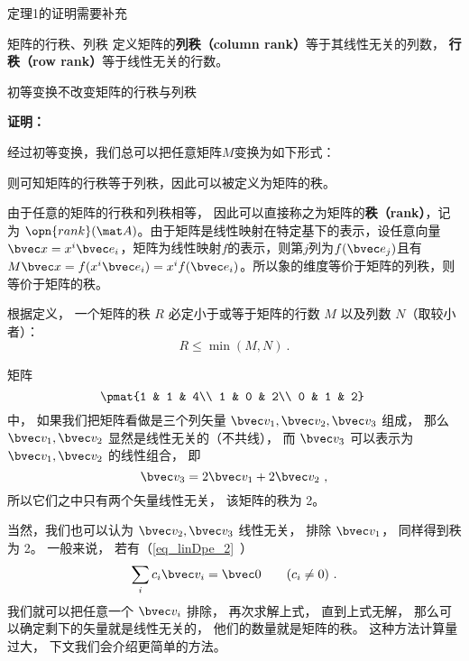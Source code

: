 
\begin{issues}
\issueDraft 定理1的证明需要补充
\end{issues}


\begin{definition}{矩阵的行秩、列秩}
定义矩阵的\textbf{列秩（column rank）}等于其线性无关的列数， \textbf{行秩（row rank）}等于线性无关的行数。
\end{definition}
\begin{theorem}{}
初等变换不改变矩阵的行秩与列秩
\end{theorem}
\textbf{证明：}

经过初等变换，我们总可以把任意矩阵$M$变换为如下形式：


则可知矩阵的行秩等于列秩，因此可以被定义为矩阵的秩。

\begin{definition}{}
由于任意的矩阵的行秩和列秩相等， 因此可以直接称之为矩阵的\textbf{秩（rank）}，记为 $\opn{rank}(\mat A)$。由于矩阵是线性映射在特定基下的表示，设任意向量$\bvec x=x^i\bvec e_i$，矩阵为线性映射$f$的表示，则第$j$列为$f(\bvec e_j)$且有$M\bvec x=f(x^i\bvec  e_i)=x^if(\bvec e_i)$。所以象的维度等价于矩阵的列秩，则等价于矩阵的秩。
\end{definition}




\begin{theorem}{}
根据定义， 一个矩阵的秩 $R$ 必定小于或等于矩阵的行数 $M$ 以及列数 $N$（取较小者）：
\begin{equation}
R\leq \min (M, N)~.
\end{equation}
\end{theorem}

\begin{example}{}
矩阵
\begin{equation}\label{eq_MatRnk_1}
\pmat{1 & 1 & 4\\ 1 & 0 & 2\\ 0 & 1 & 2}~
\end{equation}
中， 如果我们把矩阵看做是三个列矢量 $\bvec v_1, \bvec v_2, \bvec v_3$ 组成， 那么 $\bvec v_1, \bvec v_2$ 显然是线性无关的（不共线）， 而 $\bvec v_3$ 可以表示为 $\bvec v_1, \bvec v_2$ 的线性组合， 即
\begin{equation}
\bvec v_3 = 2\bvec v_1 + 2\bvec v_2~,
\end{equation}
所以它们之中只有两个矢量线性无关， 该矩阵的秩为 2。

当然，我们也可以认为 $\bvec v_2, \bvec v_3$ 线性无关， 排除 $\bvec v_1$， 同样得到秩为 2。 一般来说， 若有（\autoref{eq_linDpe_2}~）
\begin{equation}
\sum_i c_i \bvec v_i = \bvec 0 \qquad (c_i \ne 0)~.
\end{equation}
我们就可以把任意一个 $\bvec v_i$ 排除， 再次求解上式， 直到上式无解， 那么可以确定剩下的矢量就是线性无关的， 他们的数量就是矩阵的秩。 这种方法计算量过大， 下文我们会介绍更简单的方法。
\end{example}

